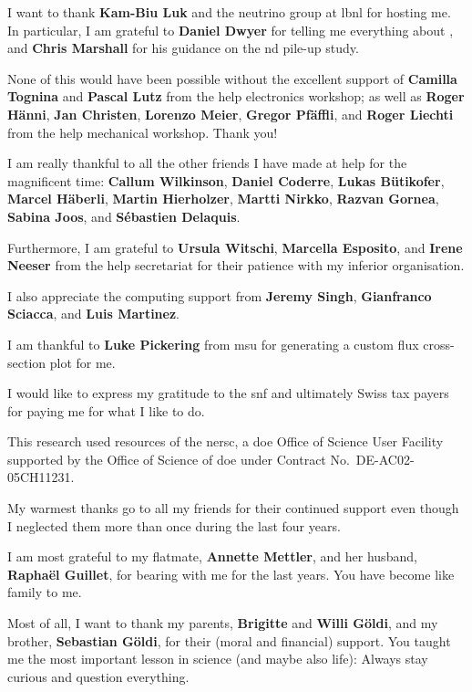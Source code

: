 I want to thank \textbf{Kam-Biu Luk} and the neutrino group at \gls{lbnl} for hosting me.
In particular, I am grateful to \textbf{Daniel Dwyer} for telling me everything about \larpix{}, and \textbf{Chris Marshall} for his guidance on the \gls{nd} pile-up study.

None of this would have been possible without the excellent support of \textbf{Camilla Tognina} and \textbf{Pascal Lutz} from the \gls{help} electronics workshop; as well as \textbf{Roger Hänni}, \textbf{Jan Christen}, \textbf{Lorenzo Meier}, \textbf{Gregor Pfäffli}, and \textbf{Roger Liechti} from the \gls{help} mechanical workshop.
Thank you!

I am really thankful to all the other friends I have made at \gls{help} for the magnificent time: \textbf{Callum Wilkinson}, \textbf{Daniel Coderre}, \textbf{Lukas Bütikofer}, \textbf{Marcel Häberli}, \textbf{Martin Hierholzer}, \textbf{Martti Nirkko}, \textbf{Razvan Gornea}, \textbf{Sabina Joos}, and \textbf{Sébastien Delaquis}.

Furthermore, I am grateful to \textbf{Ursula Witschi}, \textbf{Marcella Esposito}, and \textbf{Irene Neeser} from the \gls{help} secretariat for their patience with my inferior organisation.

I also appreciate the computing support from \textbf{Jeremy Singh}, \textbf{Gianfranco Sciacca}, and \textbf{Luis Martinez}.

I am thankful to \textbf{Luke Pickering} from \gls{msu} for generating a custom flux cross-section plot for me.

I would like to express my gratitude to the \gls{snf} and ultimately Swiss tax payers for paying me for what I like to do.

This research used resources of the \gls{nersc}, a \gls{doe} Office of Science User Facility supported by the Office of Science of \gls{doe} under Contract No.\ DE-AC02-05CH11231.

My warmest thanks go to all my friends for their continued support even though I neglected them more than once during the last four years.

I am most grateful to my flatmate, \textbf{Annette Mettler}, and her husband, \textbf{Raphaël Guillet}, for bearing with me for the last years.
You have become like family to me.

Most of all, I want to thank my parents, \textbf{Brigitte} and \textbf{Willi Göldi}, and my brother, \textbf{Sebastian Göldi}, for their (moral and financial) support.
You taught me the most important lesson in science (and maybe also life): Always stay curious and question everything.